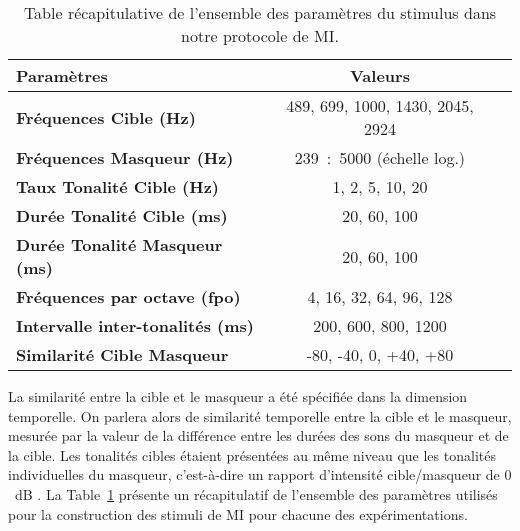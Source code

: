 \begin{table}[!ht]
\centering
\footnotesize
\caption[Table de l'ensemble des paramètres construisant les stimuli du protocole de masquage informationnel]{Table récapitulative de l'ensemble des paramètres du stimulus dans notre protocole de MI. 
}
\label{fig:table3parametres}
\begin{tabular}{|l||*{2}{c|}}\hline
\textbf{Paramètres} & {\textbf{Valeurs}} \\\hline\hline
\textbf{Fréquences Cible (Hz)} & 489, 699, 1000, 1430, 2045, 2924 \\\hline
\textbf{Fréquences Masqueur (Hz)} & 239~:~5000 (échelle log.) \\\hline
\textbf{Taux Tonalité Cible (Hz)} & 1, 2, 5, 10, 20 \\\hline
\textbf{Durée Tonalité Cible (ms)} & 20, 60, 100 \\\hline
\textbf{Durée Tonalité Masqueur (ms)} & 20, 60, 100 \\\hline
\textbf{Fréquences par octave (fpo)} & 4, 16, 32, 64, 96, 128 \\\hline
\textbf{Intervalle inter-tonalités (ms)} & 200, 600, 800, 1200 \\\hline
\textbf{Similarité Cible Masqueur} & -80, -40, 0, +40, +80 \\\hline
\end{tabular}
\end{table}

La similarité entre la cible et le masqueur a été spécifiée dans la dimension temporelle. 
On parlera alors de similarité temporelle entre la cible et le masqueur, mesurée par la valeur de la différence entre les durées des sons du masqueur et de la cible.
Les tonalités cibles étaient présentées au même niveau que les tonalités individuelles du masqueur, c'est-à-dire un rapport d'intensité cible/masqueur de $0$~dB \citep{dykstra2016neural}. 
La Table~\ref{fig:table3parametres} présente un récapitulatif de l'ensemble des paramètres utilisés pour la construction des stimuli de MI pour chacune des expérimentations. 

